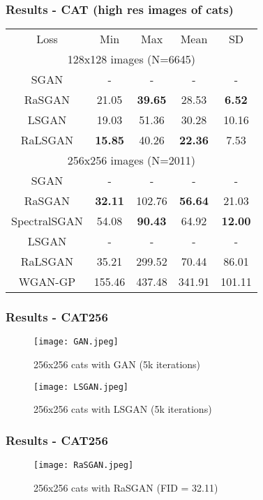 \documentclass[t]{beamer}
\begin{document}
\begin{frame}
	\frametitle{Results - CAT (high res images of cats)}
	
	\small \begin{table}
		\centering
		\begin{tabular}{ccccc}
			\toprule
			Loss & Min & Max & Mean & SD \\
			\cmidrule{1-5}
			\multicolumn{5}{c}{128x128 images (N=6645)} \\
			SGAN & - & - & - & - \\
			RaSGAN & 21.05 & \textbf{39.65} & 28.53 & \textbf{6.52} \\
			\cmidrule{1-5}
			LSGAN & 19.03 & 51.36 & 30.28 & 10.16 \\
			RaLSGAN & \textbf{15.85} & 40.26 & \textbf{22.36} & 7.53 \\
			\cmidrule{1-5}
			\multicolumn{5}{c}{256x256 images (N=2011)} \\
			SGAN & - & - & - & - \\
			RaSGAN & \textbf{32.11} & 102.76 & \textbf{56.64} & 21.03 \\
			SpectralSGAN & 54.08 & \textbf{90.43} & 64.92 & \textbf{12.00} \\
			\cmidrule{1-5}
			LSGAN & - & - & - & - \\
			RaLSGAN & 35.21 & 299.52 & 70.44 & 86.01 \\
			\cmidrule{1-5}
			WGAN-GP & 155.46 & 437.48 & 341.91 & 101.11 \\
		\end{tabular}
	\end{table}
	
\end{frame}


\begin{frame}
	\frametitle{Results - CAT256}
	
\begin{figure}[H]
	\centering
	\texttt{[image: GAN.jpeg]}
	\caption{256x256 cats with GAN (5k iterations)}
\end{figure}

\begin{figure}[H]
	\centering
	\texttt{[image: LSGAN.jpeg]}
	\caption{256x256 cats with LSGAN (5k iterations)}
\end{figure}
\end{frame}


\begin{frame}
	\frametitle{Results - CAT256}

\begin{figure}[H]
	\centering
	\texttt{[image: RaSGAN.jpeg]}
	\caption{256x256 cats with RaSGAN (FID = 32.11)}
\end{figure}
\end{frame}
\end{document}
